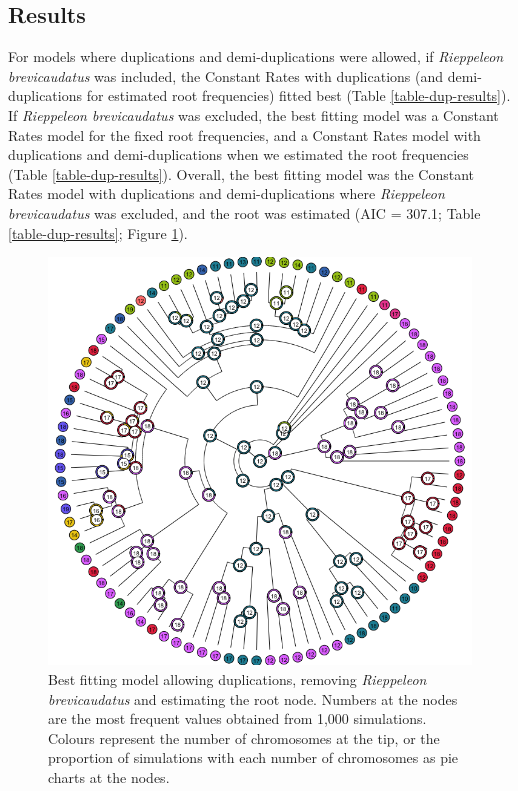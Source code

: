 \documentclass[a4paper, 12pt]{article}
\begin{document}


\subsection{Results}

For models where duplications and demi-duplications were allowed, if \textit{Rieppeleon brevicaudatus} was included, the Constant Rates with duplications (and demi-duplications for estimated root frequencies) fitted best (Table \ref{table-dup-results}). If \textit{Rieppeleon brevicaudatus} was excluded, the best fitting model was a Constant Rates model for the fixed root frequencies, and a Constant Rates model with duplications and demi-duplications when we estimated the root frequencies (Table \ref{table-dup-results}). Overall, the best fitting model was the Constant Rates model with duplications and demi-duplications where \textit{Rieppeleon brevicaudatus} was excluded, and the root was estimated (AIC = 307.1; Table \ref{table-dup-results}; Figure \ref{fig-dup}).



\newpage
\begin{figure}[H]
 \centering
  \includegraphics[width = \linewidth]{figures/figure-chromEvol_best-model-all.png}
  \caption{Best fitting model allowing duplications, removing \textit{Rieppeleon brevicaudatus} and estimating the root node. Numbers at the nodes are the most frequent values obtained from 1,000 simulations. Colours represent the number of chromosomes at the tip, or the proportion of simulations with each number of chromosomes as pie charts at the nodes.
}
  \label{fig-dup}
\end{figure} 
\end{document}

